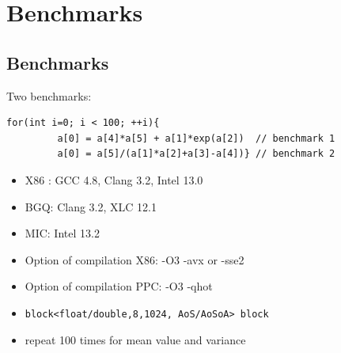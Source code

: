\documentclass{beamer}
\begin{document}
\section[Benchmark]{Benchmarks}
\subsection*{Benchmarks}
\begin{frame}[fragile]
\centering
Two benchmarks:
 \begin{lstlisting}[flexiblecolumns=true,basicstyle=\sffamily]     
     for(int i=0; i < 100; ++i){
         a[0] = a[4]*a[5] + a[1]*exp(a[2])  // benchmark 1
         a[0] = a[5]/(a[1]*a[2]+a[3]-a[4])} // benchmark 2
\end{lstlisting}


\begin{itemize}
\item X86 : GCC 4.8, Clang 3.2, Intel 13.0 
\item BGQ: Clang 3.2, XLC 12.1
\item MIC: Intel 13.2
\item Option of compilation X86: -O3 -avx or -sse2 
\item Option of compilation PPC:  -O3 -qhot
\item \verb+block<float/double,8,1024, AoS/AoSoA> block+
\item  repeat 100 times for mean value and variance
\end{itemize}

\end{frame}


\end{document}
